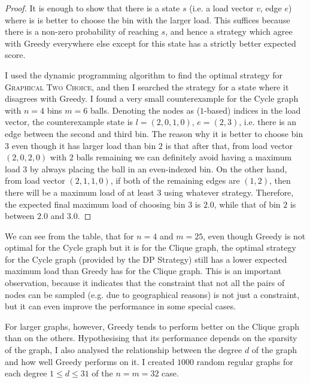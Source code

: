 \begin{proof}
It is enough to show that there is a state $s$ (i.e. a load vector $v$, edge $e$) where is is better to choose the bin with the larger load. This suffices because there is a non-zero probability of reaching $s$, and hence a strategy which agree with Greedy everywhere else except for this state has a strictly better expected score.


I used the dynamic programming algorithm to find the optimal strategy for \textsc{Graphical Two Choice}, and then I searched the strategy for a state where it disagrees with Greedy. I found a very small counterexample for the Cycle graph with $n=4$ bins $m=6$ balls. Denoting the nodes as ($1$-based) indices in the load vector, the counterexample state is $l=(2,0,1,0)$, $e=(2,3)$, i.e. there is an edge between the second and third bin. The reason why it is better to choose bin $3$ even though it has larger load than bin $2$ is that after that, from load vector $(2,0,2,0)$ with $2$ balls remaining we can definitely avoid having a maximum load $3$ by always placing the ball in an even-indexed bin. On the other hand, from load vector $(2,1,1,0)$, if both of the remaining edges are $(1,2)$, then there will be a maximum load of at least $3$ using whatever strategy. Therefore, the expected final maximum load of choosing bin $3$ is $2.0$, while that of bin $2$ is between $2.0$ and $3.0$.
\end{proof}


We can see from the table, that for $n=4$ and $m=25$, even though Greedy is not optimal for the Cycle graph but it is for the Clique graph, the optimal strategy for the Cycle graph (provided by the DP Strategy) still has a lower expected maximum load than Greedy has for the Clique graph. This is an important observation, because it indicates that the constraint that not all the pairs of nodes can be sampled (e.g. due to geographical reasons) is not just a constraint, but it can even improve the performance in some special cases.


For larger graphs, however, Greedy tends to perform better on the Clique graph than on the others. Hypothesising that its performance depends on the sparsity of the graph, I also analysed the relationship between the degree $d$ of the graph and how well Greedy performs on it. I created $1000$ random regular graphs for each degree $1\leq d \leq 31$ of the $n=m=32$ case. 



